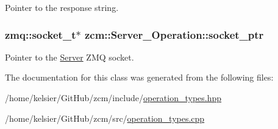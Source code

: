 Pointer to the response string. 

\hypertarget{classzcm_1_1Server__Operation_a07efad79c512d03a54fe2bb99166d52f}{
\subsubsection[{socket\-\_\-ptr}]{\setlength{\rightskip}{0pt plus 5cm}zmq\-::socket\-\_\-t$\ast$ zcm\-::\-Server\-\_\-\-Operation\-::socket\-\_\-ptr\hspace{0.3cm}{\ttfamily [private]}}}\label{classzcm_1_1Server__Operation_a07efad79c512d03a54fe2bb99166d52f}


Pointer to the \hyperlink{classzcm_1_1Server}{Server} Z\-M\-Q socket. 



The documentation for this class was generated from the following files\-:\begin{DoxyCompactItemize}
\item 
/home/kelsier/\-Git\-Hub/zcm/include/\hyperlink{operation__types_8hpp}{operation\-\_\-types.\-hpp}\item 
/home/kelsier/\-Git\-Hub/zcm/src/\hyperlink{operation__types_8cpp}{operation\-\_\-types.\-cpp}\end{DoxyCompactItemize}
